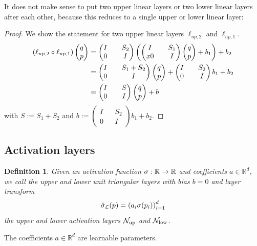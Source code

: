 \documentclass[twoside,a4paper]{article}
\newtheorem{definition}{Definition}
\begin{document}
It does not make sense to put two upper linear layers or two lower linear layers after each other,
because this reduces to a single upper or lower linear layer:

\begin{proof}
	We show the statement for two upper linear layers $\ell_{up,2}$ and $\ell_{up,1}$.
	\begin{align*}
		\left( \ell_{up,2} \circ \ell_{up,1} \right) \begin{pmatrix} q \\ p \end{pmatrix} &=
		\begin{pmatrix}
			I && S_2 \\
			0 && I
		\end{pmatrix}
		\left(
		\begin{pmatrix}
			I && S_1 \\x
			0 && I
		\end{pmatrix}
		\begin{pmatrix} q \\ p \end{pmatrix} + b_1
		\right) + b_2 \\
		&= \begin{pmatrix}
			I && S_1 + S_2 \\
			0 && I
		\end{pmatrix} \begin{pmatrix} q \\ p \end{pmatrix}
		+ \begin{pmatrix}
			I && S_2 \\
			0 && I
		\end{pmatrix} b_1
		+ b_2 \\
		&= \begin{pmatrix}
			I && S \\
			0 && I
		\end{pmatrix} \begin{pmatrix} q \\ p \end{pmatrix} + b
	\end{align*}
	with $S := S_1 + S_2$ and $b := \begin{pmatrix}
		I && S_2 \\
		0 && I
	\end{pmatrix} b_1
	+ b_2$.
\end{proof}

\subsection{Activation layers}

\begin{definition}
	Given an activation function $\sigma : \mathbb{R} \to \mathbb{R}$ and coefficients $a \in \mathbb{R}^d$, 
	we call the upper and lower unit triangular layers with bias $b=0$ and layer transform
	\begin{equation*}
		\hat{\sigma}_{\mathcal{L}}(p) = \left( a_i \sigma(p_i) \right)_{i=1}^d
	\end{equation*}
	the upper and lower activation layers $\mathcal{N}_{\text{up}}$ and $\mathcal{N}_{\text{low}}$.
\end{definition}
The coefficients $a \in \mathbb{R}^d$ are learnable parameters.
\end{document}
